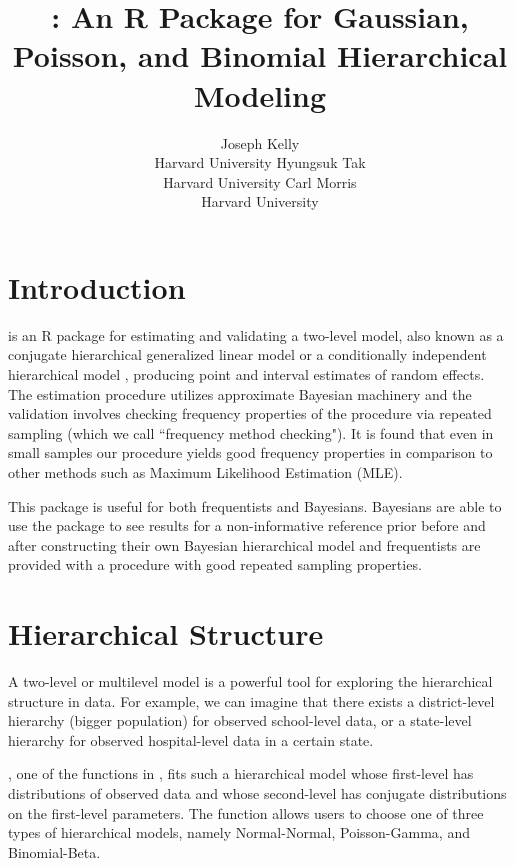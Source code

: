 \documentclass[article]{jss}
\author{Joseph Kelly\\Harvard University \And 
             Hyungsuk Tak\\Harvard University\And
             Carl Morris\\ Harvard University}
\title{\pkg{Rgbp}: An R Package for Gaussian, Poisson, and Binomial Hierarchical Modeling}
\begin{document}

\section[Introduction]{Introduction}
 is an R package for estimating and validating a two-level model, also known as a conjugate hierarchical generalized linear model \citep{hglm2006, hglm2010} or a conditionally independent hierarchical model \citep{1989}, producing point and interval estimates of  random effects. The estimation procedure utilizes approximate Bayesian machinery and the validation involves checking frequency properties of the procedure via repeated sampling (which we call ``frequency method checking"). It is found that even in small samples our procedure yields good frequency properties in comparison to other methods such as Maximum Likelihood Estimation (MLE). 

This package is useful for both frequentists and Bayesians. Bayesians are able to use the package to see results for a non-informative reference prior before and after constructing their own Bayesian hierarchical model and frequentists are provided with a procedure with good repeated sampling properties.

\section[Hierarchical Structure]{Hierarchical Structure} \label{hierarchical}
A two-level or multilevel model is a powerful tool for exploring the hierarchical structure in data. For example, we can imagine that there exists a district-level hierarchy (bigger population) for observed school-level data, or a state-level hierarchy for observed hospital-level data in a certain state. 

, one of the functions in , fits such a hierarchical model whose first-level has distributions of observed data and whose second-level has conjugate distributions on the first-level parameters. The  function allows users to choose one of three types of hierarchical models, namely Normal-Normal, Poisson-Gamma, and Binomial-Beta. 
 
\end{document}
